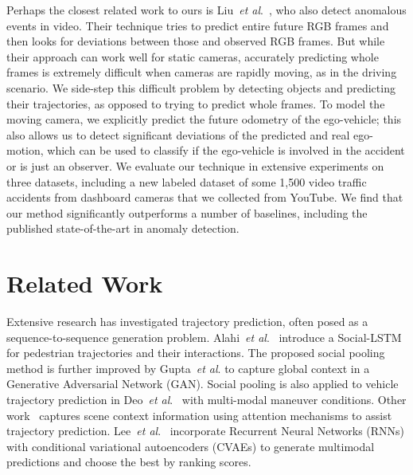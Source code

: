 \documentclass[letterpaper, 10 pt, conference]{ieeeconf}
\theoremstyle{definition}
\theoremstyle{remark}
\newcommand{\etal}{\textit{et al}.}
\begin{document}
Perhaps the closest related work to ours is Liu~\etal~\cite{liu2018future}, who also detect
anomalous events in video. Their technique tries to predict entire future RGB frames and then 
looks for deviations between those and observed RGB frames.
But while their approach can work well for static cameras, 
accurately predicting whole frames is extremely difficult when cameras
are rapidly moving, as in the driving scenario.
We side-step this difficult problem by detecting objects and predicting
their trajectories, as opposed to trying to predict
whole frames. To model the moving camera, 
we explicitly predict the
future odometry of the ego-vehicle; this also allows us to detect significant deviations of the predicted
and real ego-motion, which can be used to 
classify if the ego-vehicle 
is involved in the accident or is just an observer.
We evaluate our technique in extensive experiments on three datasets,
including a new labeled dataset of some 1,500 video traffic accidents
from dashboard cameras that we collected from YouTube. We find that
our method significantly outperforms a number of baselines, including
the published state-of-the-art in anomaly detection.
 \section{Related Work}

Extensive research has investigated trajectory prediction, often
posed as a sequence-to-sequence generation problem.
Alahi~\etal~\cite{Alahi_2016_CVPR} introduce a Social-LSTM for
pedestrian trajectories and their interactions. The proposed
social pooling method is further improved by
Gupta~\etal\cite{gupta2018social} to capture global context in
a Generative Adversarial Network (GAN). Social pooling is also applied
to vehicle trajectory prediction in Deo~\etal~\cite{Deo2018} with
multi-modal maneuver conditions. Other
work~\cite{sadeghian2018car,sadeghian2018sophie} captures scene context
information using attention mechanisms to assist trajectory prediction.
Lee~\etal~\cite{lee2017desire} incorporate Recurrent Neural Networks
(RNNs) with conditional variational autoencoders (CVAEs) to generate
multimodal predictions and choose the best by ranking scores. 
\end{document}
